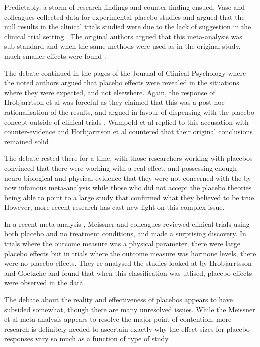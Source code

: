 Predictably, a storm of research findings and counter finding ensued. Vase and colleagues collected data for experimental placebo studies and argued that the null results in the clinical trials studied were due to the lack of suggestion in the clinical trial setting \cite{Vase2002}.  The original authors argued that this meta-analysis was sub-standard and when the same methods were used as in the original study, much smaller effects were found \cite{Hrobjartsson2003}. 

The debate continued in the pages of the Journal of Clinical Psychology \cite{Wampold2005}  where the noted authors argued that placebo effects were revealed in the situations where they were expected, and not elsewhere. Again, the response of Hrobjarrtson et al was forceful as they claimed that this was a post hoc rationalisation of the results, and argued in favour of dispensing with the placebo concept outside of clinical trials \cite{Hrobjartsson2007a} . Wampold et al replied to this accusation \cite{Wampol2007}  with counter-evidence and Horbjarrtson et al countered that their original conclusions remained solid \cite{Hrobjartsson2007}. 

The debate rested there for a time, with those researchers working with placebos convinced that there were working with a real effect, and possessing enough neuro-biological and physical evidence that they were not concerned with the by now infamous meta-analysis while those who did not accept the placebo theories being able to point to a large study that confirmed what they believed to be true. However, more recent research has cast new light on this complex issue. 

In a recent meta-analysis  \cite{Meissner2007}, Meissner and colleagues reviewed clinical trials using both placebo and no treatment conditions, and made a surprising discovery. In trials where the outcome measure was a physical parameter, there were large placebo effects but in trials where the outcome measure was hormone levels, there were no placebo effects. They re-analysed the studies looked at by Hrobjarrtsson and Goetzche and found that when this classification was utlised, placebo effects were observed in the data. %

The debate about the reality and effectiveness of placebos appears to have subsided somewhat, though there are many unresolved issues. While the Meissner et al meta-analysis appears to resolve the major point of contention, more research is definitely needed to ascertain exactly why the effect sizes for placebo responses vary so much as a function of type of study.

